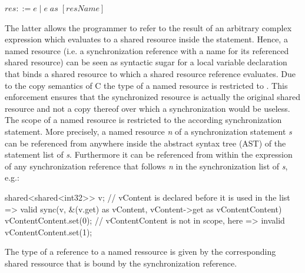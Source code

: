 $ res ::= e\;|\;e\;\mathit{as}\;[\mathit{resName}] $

The latter allows the programmer to refer to the result of an arbitrary complex expression which evaluates to a shared resource inside the  statement. Hence, a named resource (i.e. a synchronization reference with a name for its referenced shared resource) can be seen as syntactic sugar for a local variable declaration that binds a shared resource to which a shared resource reference evaluates. Due to the copy semantics of C the type of a named resource  is restricted to . This enforcement ensures that the synchronized resource is actually the original shared resource and not a copy thereof over which a synchronization would be useless. The scope of a named resource is restricted to the according synchronization statement. More precisely, a named resource \textit{n} of a synchronization statement \textit{s} can be referenced from anywhere inside the abstract syntax tree (AST) of the statement list of \textit{s}. Furthermore it can be referenced from within the expression of any synchronization reference that follows \textit{n} in the synchronization list of \textit{s}, e.g.:
\begin{ccode}
shared<shared<int32>> v;
// vContent is declared before it is used in the list => valid
sync(v, &(v.get) as vContent, vContent->get as vContentContent) {
  vContentContent.set(0);
}
// vContentContent is not in scope, here => invalid
vContentContent.set(1);
\end{ccode}

The type of a reference to a named ressource is given by the corresponding shared ressource that is bound by the  synchronization reference.

